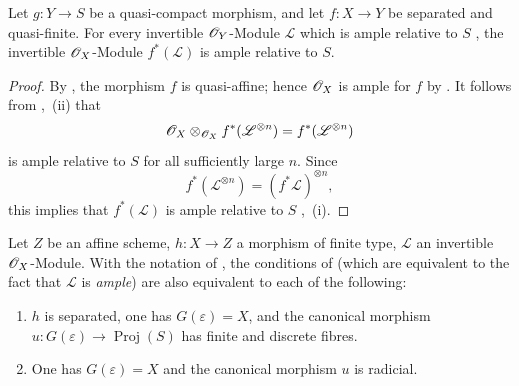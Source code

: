 \begin{proposition}[18.12.16]
\label{IV.18.12.16}
Let $g:Y\to S$ be a quasi-compact morphism, and let $f:X\to Y$ be separated and quasi-finite.
For every invertible $\mathscr{O}_Y$-Module $\mathscr{L}$ which is ample relative to $S$ , the invertible $\mathscr{O}_X$-Module $f^*(\mathscr{L})$ is ample relative to $S$.
\end{proposition}

\begin{proof}
By , the morphism $f$ is quasi-affine; hence $\mathscr{O}_X$ is ample for $f$ by . It follows from ,~(ii) that
\[
  \mathscr{O}_X\otimes_{\mathscr{O}_X}f^*(\mathscr{L}^{\otimes n})
  =f^*(\mathscr{L}^{\otimes n})
\]
is ample relative to $S$ for all sufficiently large $n$. Since
\[
  f^*(\mathscr{L}^{\otimes n})=(f^*\mathscr{L})^{\otimes n},
\]
this implies that $f^*(\mathscr{L})$ is ample relative to $S$ ,~(i).
\end{proof}

\begin{corollary}[18.12.17]
\label{IV.18.12.17}
Let $Z$ be an affine scheme, $h:X\to Z$ a morphism of finite type, $\mathscr{L}$ an invertible $\mathscr{O}_X$-Module.
With the notation of \textup{}, the conditions of \textup{} \textup{(which are equivalent to the fact that $\mathscr{L}$ is \emph{ample})} are also equivalent to each of the following:
\begin{enumerate}
  \item[\textup{b$''$)}] $h$ is separated, one has $G(\varepsilon)=X$, and the canonical morphism $u:G(\varepsilon)\to\operatorname{Proj}(S)$ has finite and discrete fibres.
  \item[\textup{b$'''$)}] One has $G(\varepsilon)=X$ and the canonical morphism $u$ is radicial.
\end{enumerate}
\end{corollary}

